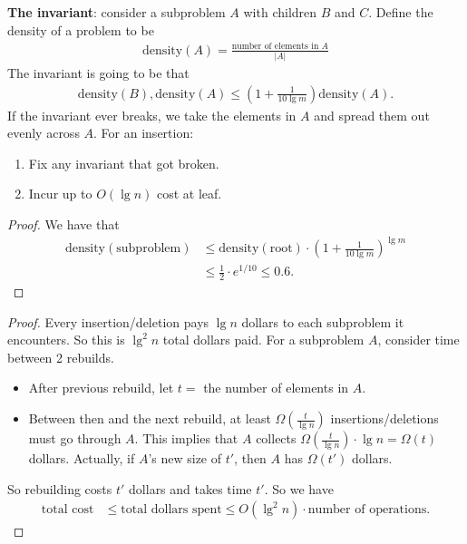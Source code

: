 \documentclass{report}
\begin{document}
\noindent \textbf{The invariant}: consider a subproblem $A$ with children $B$ and $C$. Define the density of a problem to be 
\begin{align*}
    \mathrm{density}(A) = \frac{\text{number of elements in $A$}}{|A|}
\end{align*}
The invariant is going to be that 
\begin{align*}
    \mathrm{density}(B), \mathrm{density}(A) \leq \left(1 + \frac{1}{10 \lg m}\right)\mathrm{density}(A).
\end{align*}
If the invariant ever breaks, we take the elements in $A$ and spread them out evenly across $A$. For an insertion:
\begin{enumerate}
    \item Fix any invariant that got broken.
    \item Incur up to $O(\lg n)$ cost at leaf.
\end{enumerate}
\newpage
{}
\begin{proof}
    We have that 
    \begin{align*}
        \mathrm{density}(\mathrm{subproblem}) &\leq \mathrm{density}(\mathrm{root}) \cdot \left(1 + \frac{1}{10 \lg m}\right)^{\lg m} \\
        &\leq \frac 12 \cdot e^{1/10} \leq 0.6.
    \end{align*}
\end{proof}
\begin{proof}
    Every insertion/deletion pays $\lg n$ dollars to each subproblem it encounters. So this is $\lg^2n$ total dollars paid. For a subproblem $A$, consider time between 2 rebuilds.
    \begin{itemize}
        \item After previous rebuild, let $t =$ the number of elements in $A$.
        \item Between then and the next rebuild, at least $\Omega\left(\frac{t}{\lg n}\right)$ insertions/deletions must go through $A$. This implies that $A$ collects $\Omega\left(\frac{t}{\lg n}\right)\cdot \lg n = \Omega(t)$ dollars. Actually, if $A$'s new size of $t'$, then $A$ has $\Omega(t')$ dollars.
    \end{itemize}
    So rebuilding costs $t'$ dollars and takes time $t'$. So we have 
    \begin{align*}
        \text{total cost} &\leq \text{total dollars spent} \leq O(\lg^2 n) \cdot \text{number of operations}.
    \end{align*}
\end{proof}
\end{document}
